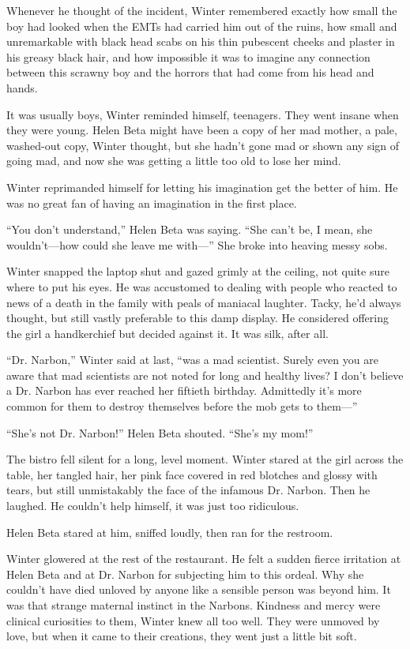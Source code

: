 \documentclass[ebook,10pt]{memoir}
\begin{document}
Whenever he thought of the incident, Winter remembered exactly how
small the boy had looked when the EMTs had carried him out of the
ruins, how small and unremarkable with black head scabs on his thin
pubescent cheeks and plaster in his greasy black hair, and how
impossible it was to imagine any connection between this scrawny boy
and the horrors that had come from his head and hands.

It was usually boys, Winter reminded himself, teenagers. They went
insane when they were young. Helen Beta might have been a copy of her
mad mother, a pale, washed-out copy, Winter thought, but she hadn't
gone mad or shown any sign of going mad, and now she was getting a
little too old to lose her mind.

Winter reprimanded himself for letting his imagination get the better
of him. He was no great fan of having an imagination in the first
place. 

``You don't understand,'' Helen Beta was saying. ``She can't be, I
mean, she wouldn't---how could she leave me with---'' She broke into
heaving messy sobs.

Winter snapped the laptop shut and gazed grimly at the ceiling, not
quite sure where to put his eyes. He was accustomed to dealing with
people who reacted to news of a death in the family with peals of
maniacal laughter. Tacky, he'd always thought, but still vastly
preferable to this damp display. He considered offering the girl a
handkerchief but decided against it. It was silk, after all.

``Dr. Narbon,'' Winter said at last, ``was a mad scientist. Surely
even you are aware that mad scientists are not noted for long and
healthy lives? I don't believe a Dr. Narbon has ever reached her
fiftieth birthday. Admittedly it's more common for them to destroy
themselves before the mob gets to them---''

``She's not Dr. Narbon!'' Helen Beta shouted. ``She's my mom!''

The bistro fell silent for a long, level moment. Winter stared at the
girl across the table, her tangled hair, her pink face covered in red
blotches and glossy with tears, but still unmistakably the face of the
infamous Dr. Narbon. Then he laughed. He couldn't help himself, it was
just too ridiculous.

Helen Beta stared at him, sniffed loudly, then ran for the restroom.

Winter glowered at the rest of the restaurant. He felt a sudden fierce
irritation at Helen Beta and at Dr. Narbon for subjecting him to this
ordeal. Why she couldn't have died unloved by anyone like a sensible
person was beyond him. It was that strange maternal instinct in the
Narbons. Kindness and mercy were clinical curiosities to them, Winter
knew all too well. They were unmoved by love, but when it came to
their creations, they went just a little bit soft.
\end{document}

